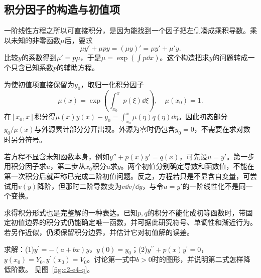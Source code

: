 \subsection{积分因子的构造与初值项}
一阶线性方程之所以可直接积分，是因为能找到一个因子把左侧凑成乘积导数。乘以未知的非零函数$\mu$后，要求
\[\mu y'+\mu p y=(\mu y)'=\mu y'+\mu' y.\]
比较$y$的系数得到$\mu'=p\mu$，于是$\mu=\exp(\int p\dd x)$。这个构造把求$y$的问题转成一个只含已知系数$p$的辅助方程。

为使初值项直接保留为$y_0$，取归一化积分因子
\[\mu(x)=\exp\left(\int_{x_0}^xp(\xi)\dd\xi\right),\quad \mu(x_0)=1.\]
在$[x_0,x]$积分得$\mu(x)y(x)-y_0=\int_{x_0}^x\mu(\eta)q(\eta)\dd\eta$。因此初态部分$y_0/\mu(x)$与外源累计部分分开出现。外源为零时仍包含$y_0=0$，不需要在求对数时另分符号。

若方程不显含未知函数本身，例如$y''+p(x)y'=q(x)$，可先设$u=y'$。第一步用积分因子求$u$，第二步从$x_0$积分$u$求$y$。两个初值分别确定导数和函数值，不能在第一次积分后就声称已完成二阶初值问题。反之，方程若只是不显含自变量，可尝试用$v(y)$降阶，但那时二阶导数变为$v\dd v/\dd y$，与令$u=y'$的一阶线性化不是同一个变换。

求得积分形式也是完整解的一种表达。已知$p,q$的积分不能化成初等函数时，带固定初值边界的积分式仍能确定唯一函数，并可据此研究符号、单调性和渐近行为。若另作近似，仍须保留积分边界，并估计它对初值解的误差。

\begin{example}[变化系数的衰减与降阶]\label{ex:c2-e4}
求解：(1)$y^{\prime}=-(a+bx)y$，$y(0)=y_0$；(2)$y^{\prime\prime}+p(x)y^{\prime}=0$，$y(x_0)=Y_0,y^{\prime}(x_0)=V_0$。讨论第一式中$b>0$时的图形，并说明第二式怎样降低阶数。 见图~\ref{fig:c2-e4-q}。
\end{example}

